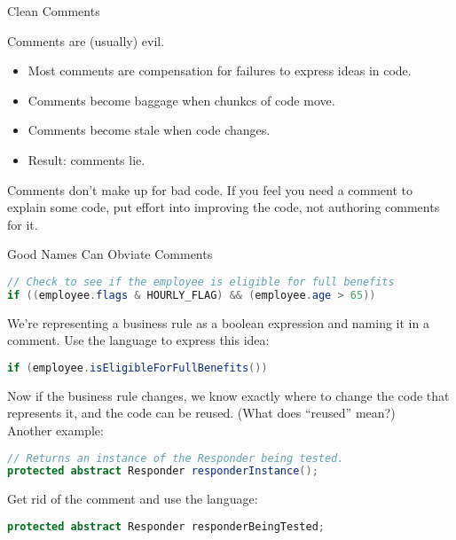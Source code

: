 \documentclass{beamer}
\author[Chris Simpkins] 
{Christopher Simpkins \\\texttt{chris.simpkins@gatech.edu}}
\institute[Georgia Tech] %
\date[CS 1331]{}
\begin{document}
\begin{frame}
  \titlepage
\end{frame}

\begin{frame}[fragile]{Clean Comments}


Comments are (usually) evil.
\begin{itemize}
\item Most comments are compensation for failures to express ideas in code.
\item Comments become baggage when chunkcs of code move.
\item Comments become stale when code changes.
\item Result: comments lie.
\end{itemize}

Comments don't make up for bad code.  If you feel you need a comment to explain some code, put effort into improving the code, not authoring comments for it.


\end{frame}

\begin{frame}[fragile]{Good Names Can Obviate Comments}


\begin{lstlisting}[language=Java]
// Check to see if the employee is eligible for full benefits
if ((employee.flags & HOURLY_FLAG) && (employee.age > 65))
\end{lstlisting}
We're representing a business rule as a boolean expression and naming it in a comment.  Use the language to express this idea:
\begin{lstlisting}[language=Java]
if (employee.isEligibleForFullBenefits())
\end{lstlisting}
Now if the business rule changes, we know exactly where to change the code that represents it, and the code can be reused.  (What does ``reused'' mean?)\\
Another example:
\begin{lstlisting}[language=Java]
// Returns an instance of the Responder being tested.
protected abstract Responder responderInstance();
\end{lstlisting}
Get rid of the comment and use the language:
\begin{lstlisting}[language=Java]
protected abstract Responder responderBeingTested;
\end{lstlisting}


\end{frame}
\end{document}
